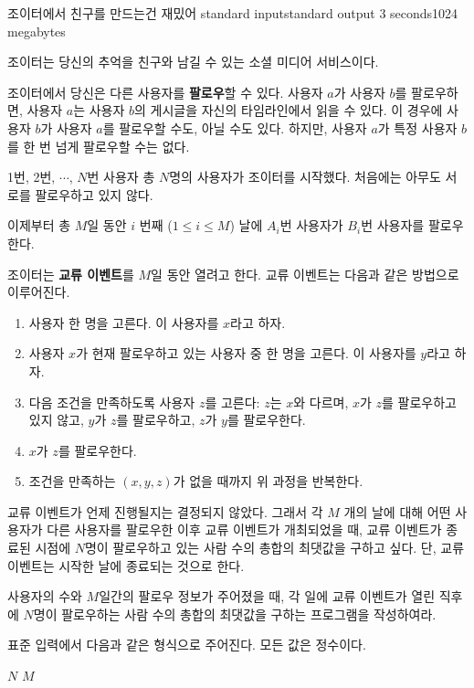 \begin{problem}{조이터에서 친구를 만드는건 재밌어}
	{standard input}{standard output}
	{3 seconds}{1024 megabytes}{}
	
	조이터는 당신의 추억을 친구와 남길 수 있는 소셜 미디어 서비스이다.
	
	조이터에서 당신은 다른 사용자를 \textbf{팔로우}할 수 있다. 사용자 $a$가 사용자 $b$를 팔로우하면, 사용자 $a$는 사용자 $b$의 게시글을 자신의 타임라인에서 읽을 수 있다. 이 경우에 사용자 $b$가 사용자 $a$를 팔로우할 수도, 아닐 수도 있다. 하지만, 사용자 $a$가 특정 사용자 $b$를 한 번 넘게 팔로우할 수는 없다.
	
	1번, 2번, $\cdots$, $N$번 사용자 총 $N$명의 사용자가 조이터를 시작했다. 처음에는 아무도 서로를 팔로우하고 있지 않다.
	
	이제부터 총 $M$일 동안 $i$ 번째 ($1 \le i \le M$) 날에 $A_i$번 사용자가 $B_i$번 사용자를 팔로우한다. 
	
	조이터는 \textbf{교류 이벤트}를 $M$일 동안 열려고 한다. 교류 이벤트는 다음과 같은 방법으로 이루어진다.
	
	\begin{enumerate}
		\item 사용자 한 명을 고른다. 이 사용자를 $x$라고 하자.
		\item 사용자 $x$가 현재 팔로우하고 있는 사용자 중 한 명을 고른다. 이 사용자를 $y$라고 하자.
		\item 다음 조건을 만족하도록 사용자 $z$를 고른다: $z$는 $x$와 다르며, $x$가 $z$를 팔로우하고 있지 않고, $y$가 $z$를 팔로우하고, $z$가 $y$를 팔로우한다.
		\item $x$가 $z$를 팔로우한다.
		\item 조건을 만족하는 $(x, y, z)$가 없을 때까지 위 과정을 반복한다.
	\end{enumerate}
	
	교류 이벤트가 언제 진행될지는 결정되지 않았다. 그래서 각 $M$ 개의 날에 대해 어떤 사용자가 다른 사용자를 팔로우한 이후 교류 이벤트가 개최되었을 때, 교류 이벤트가 종료된 시점에 $N$명이 팔로우하고 있는 사람 수의 총합의 최댓값을 구하고 싶다. 단, 교류 이벤트는 시작한 날에 종료되는 것으로 한다.
	
	사용자의 수와 $M$일간의 팔로우 정보가 주어졌을 때, 각 일에 교류 이벤트가 열린 직후에 $N$명이 팔로우하는 사람 수의 총합의 최댓값을 구하는 프로그램을 작성하여라.
	
	
\InputFile

표준 입력에서 다음과 같은 형식으로 주어진다. 모든 값은 정수이다.

$N$ $M$


\end{problem}
